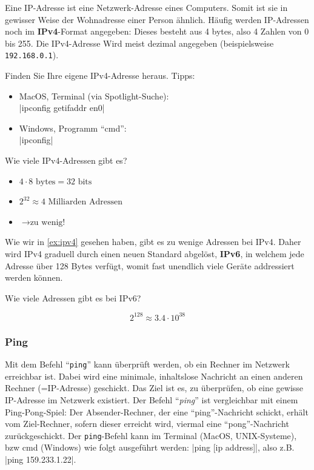 Eine \acrfull{IP}-Adresse ist eine Netzwerk-Adresse eines Computers. Somit ist sie in gewisser Weise der Wohnadresse einer Person ähnlich. Häufig werden IP-Adressen noch im \textbf{IPv4}-Format angegeben: Dieses besteht aus 4 bytes, also 4 Zahlen von 0 bis 255. Die IPv4-Adresse Wird meist dezimal angegeben (beispielsweise \texttt{192.168.0.1}).
\begin{mysubmission}
Finden Sie Ihre eigene IPv4-Adresse heraus. Tipps:
\begin{itemize}
\item MacOS, Terminal (via Spotlight-Suche): \\
\commandbox|ipconfig getifaddr en0|
\item Windows, Programm ``cmd'': \\
\commandbox|ipconfig|
\end{itemize}
\end{mysubmission}
\begin{myexercise}\label{ex:ipv4}
Wie viele IPv4-Adressen gibt es?
\begin{myanswer}
\begin{itemize}
\item $4\cdot 8 \text{ bytes} = 32 \text{ bits}$
\item $2^{32} \approx 4 \text{ Milliarden Adressen}$
\item $\rightarrow \text{zu wenig!}$
\end{itemize}
\end{myanswer}
\end{myexercise}
Wie wir in \cref{ex:ipv4} gesehen haben, gibt es zu wenige Adressen bei IPv4. Daher wird IPv4 graduell durch einen neuen Standard abgelöst, \textbf{IPv6}, in welchem jede Adresse über 128 Bytes verfügt, womit fast unendlich viele Geräte addressiert werden können.

\begin{myexercise}
Wie viele Adressen gibt es bei IPv6?
\begin{myanswer}
\[2^{128} \approx 3.4\cdot 10^{38}\]
\end{myanswer}
\end{myexercise}


\subsubsection{Ping}
Mit dem Befehl ``\texttt{ping}'' kann überprüft werden, ob ein Rechner im Netzwerk erreichbar ist. Dabei wird eine minimale, inhaltslose Nachricht an einen anderen Rechner (=IP-Adresse) geschickt. Das Ziel ist es, zu überprüfen, ob eine gewisse IP-Adresse im Netzwerk existiert. Der Befehl ``\textit{ping}'' ist vergleichbar mit einem Ping-Pong-Spiel: Der Absender-Rechner, der eine ``ping''-Nachricht schickt, erhält vom Ziel-Rechner, sofern dieser erreicht wird, viermal eine ``pong''-Nachricht zurückgeschickt. Der \texttt{ping}-Befehl kann im Terminal (MacOS, UNIX-Systeme), bzw cmd (Windows) wie folgt ausgeführt werden: \commandbox|ping [ip address]|, also z.B. \commandbox|ping 159.233.1.22|.

